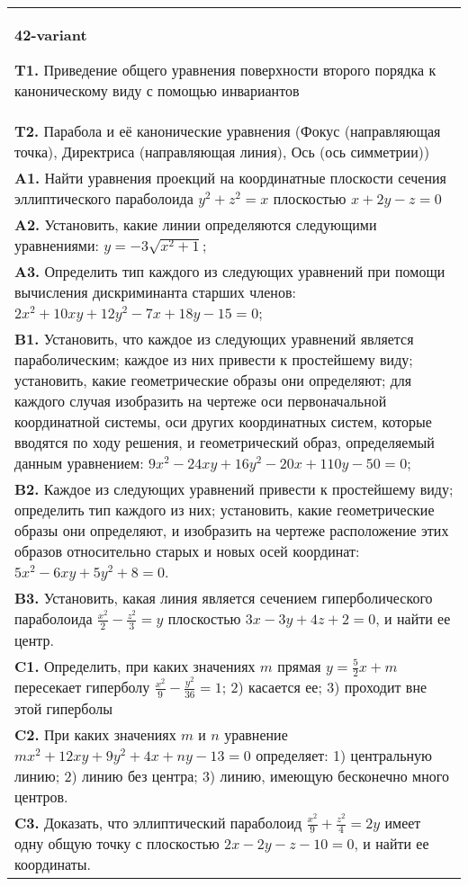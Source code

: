 \documentclass{article}
\begin{document}
\begin{tabular}{m{17cm}}
\textbf{42-variant}
\newline

\textbf{T1.} Приведение общего уравнения поверхности второго порядка к каноническому виду с помощью инвариантов \\
\textbf{T2.} Парабола и её канонические уравнения (Фокус (направляющая точка), Директриса (направляющая линия), Ось (ось симметрии)) \\
\textbf{A1.} Найти уравнения проекций на координатные плоскости сечения эллиптического параболоида $y^2+z^2=x$ плоскостью $x+2 y-z=0$ \\
\textbf{A2.} Установить, какие линии определяются следующими уравнениями: $y=-3 \sqrt{x^2+1}$; \\
\textbf{A3.} Определить тип каждого из следующих уравнений при помощи вычисления дискриминанта старших членов: $2 x^2+10 x y+12 y^2-7 x+18 y-15=0$; \\
\textbf{B1.} Установить, что каждое из следующих уравнений является параболическим; каждое из них привести к простейшему виду; установить, какие геометрические образы они определяют; для каждого случая изобразить на чертеже оси первоначальной координатной системы, оси других координатных систем, которые вводятся по ходу решения, и геометрический образ, определяемый данным уравнением: $9 x^2-24 x y+16 y^2-20 x+110 y-50=0$; \\
\textbf{B2.} Каждое из следующих уравнений привести к простейшему виду; определить тип каждого из них; установить, какие геометрические образы они определяют, и изобразить на чертеже расположение этих образов относительно старых и новых осей координат: $5 x^2-6 x y+5 y^2+8=0$. \\
\textbf{B3.} Установить, какая линия является сечением гиперболического параболоида $\frac{x^2}{2}-\frac{z^2}{3}=y$ плоскостью $3 x-3 y+4 z+2=0$, и найти ее центр. \\
\textbf{C1.} Определить, при каких значениях $m$ прямая $y=\frac{5}{2} x+m$ пересекает гиперболу $\frac{x^2}{9}-\frac{y^2}{36}=1$; 2) касается ее; 3) проходит вне этой гиперболы \\
\textbf{C2.} При каких значениях $m$ и $n$ уравнение $m x^2+12 x y+9 y^2+4 x+n y-13=0$ определяет: 1) центральную линию; 2) линию без центра; 3) линию, имеющую бесконечно много центров. \\
\textbf{C3.} Доказать, что эллиптический параболоид $\frac{x^2}{9}+\frac{z^2}{4}=2 y$ имеет одну общую точку с плоскостью $2 x-2 y-z-10=0$, и найти ее координаты. \\

\end{tabular}
\vspace{1cm}
\end{document}
